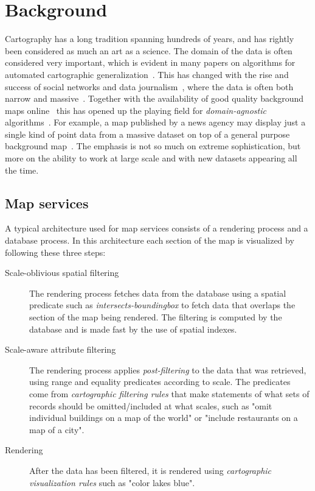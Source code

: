 \section{Background}
\label{sec:background}

Cartography has a long tradition spanning hundreds of years, and has rightly been considered as much an art as a science. The domain of the data is often considered very important, which is evident in many papers on algorithms for automated cartographic generalization~\cite{areaagg,ordnance,another}. This has changed with the rise and success of social networks and data journalism~\cite{datajournalism}, where the data is often both narrow and massive~\cite{twitter,datablog}. Together with the availability of good quality background maps online~\cite{bing,google,osm} this has opened up the playing field for \emph{domain-agnostic} algorithms~\cite{fusiontables,samet}. For example, a map published by a news agency may display just a single kind of point data from a massive dataset on top of a general purpose background map~\cite{iraq}. The emphasis is not so much on extreme sophistication, but more on the ability to work at large scale and with new datasets appearing all the time.

\subsection{Map services}

A typical architecture used for map services consists of a rendering process and a database process. In this architecture each section of the map is visualized by following these three steps:

\begin{description}
\item[Scale-oblivious spatial filtering] The rendering process fetches data from the database using a spatial predicate such as \emph{intersects-boundingbox} to fetch data that overlaps the section of the map being rendered. The filtering is computed by the database and is made fast by the use of spatial indexes.
\item[Scale-aware attribute filtering] The rendering process applies \emph{post-filtering} to the data that was retrieved, using range and equality predicates according to scale. The predicates come from \emph{cartographic filtering rules} that make statements of what sets of records should be omitted/included at what scales, such as "omit individual buildings on a map of the world" or "include restaurants on a map of a city".
\item[Rendering] After the data has been filtered, it is rendered using \emph{cartographic visualization rules} such as "color lakes blue".
\end{description}


